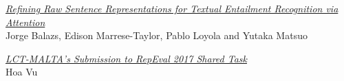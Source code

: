 \hyperlink{page.41}{\em Refining Raw Sentence Representations for Textual Entailment Recognition via Attention}\samepage \\
\hspace*{7mm} Jorge Balazs, Edison Marrese-Taylor, Pablo Loyola and Yutaka Matsuo\dotfill {}

\hyperlink{page.46}{\em LCT-MALTA's Submission to RepEval 2017 Shared Task}\samepage \\
\hspace*{7mm} Hoa Vu\dotfill {}

